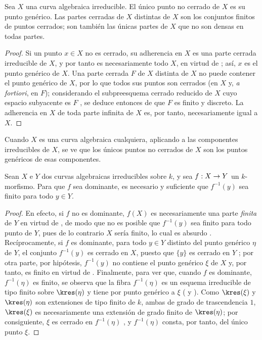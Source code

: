 \documentclass[oneside,10pt]{amsart}
\makeatletter
\newcommand{\ega@arrow}[2]{\mathchoice{#1}{#2}{#2}{#2}}
\renewcommand{\to}{\ega@arrow{\longrightarrow}{\rightarrow}}
\newcommand{\oldpage}[2][]{\marginnote{\normalfont\footnotesize\textbf{#1}~|~#2}\ignorespaces}
\let\EGAOriginalLabel\label
\renewcommand{\label}[1]{\phantomsection\EGAOriginalLabel{#1}}
\makeatother
\begin{document}
\begin{corollary}[7.4.3]
\label{II.7.4.3}
Sea $X$ una curva algebraica irreducible.
El único punto no cerrado de $X$ es su punto genérico.
Las partes cerradas de $X$ distintas de $X$ son los conjuntos finitos de puntos cerrados;
son también las únicas partes de $X$ que no son densas en todas partes.
\end{corollary}

\begin{proof}
Si un punto $x\in X$ no es cerrado, su adherencia en $X$ es una parte cerrada irreducible de $X$, y por tanto es necesariamente todo $X$, en virtud de ; así, $x$ es el punto genérico de $X$.
Una parte cerrada $F$ de $X$ distinta de $X$ no puede contener
\oldpage[II]{149}
el punto genérico de $X$, por lo que todos sus puntos son cerrados (en $X$ y, \emph{a fortiori}, en $F$);
considerando el subpreesquema cerrado reducido de $X$ cuyo espacio subyacente es $F$ , se deduce entonces de  que $F$ es finito y discreto.
La adherencia en $X$ de toda parte infinita de $X$ es, por tanto, necesariamente igual a $X$.
\end{proof}

Cuando $X$ es una curva algebraica cualquiera, aplicando  a las componentes irreducibles de $X$, se ve que los únicos puntos no cerrados de $X$ son los puntos genéricos de esas componentes.

\begin{corollary}[7.4.4]
\label{II.7.4.4}
Sean $X$ e $Y$ dos curvas algebraicas irreducibles sobre $k$, y sea $f:X\to Y$ un $k$-morfismo.
Para que $f$ sea dominante, es necesario y suficiente que $f^{-1}(y)$ sea finito para todo $y\in Y$.
\end{corollary}

\begin{proof}
En efecto, si $f$ no es dominante, $f(X)$ es necesariamente una parte \emph{finita} de $Y$ en virtud de , de modo que no es posible que $f^{-1}(y)$ sea finito para todo punto de $Y$, pues de lo contrario $X$ sería finito, lo cual es absurdo .
Recíprocamente, si $f$ es dominante, para todo $y\in Y$ distinto del punto genérico $\eta$ de $Y$, el conjunto $f^{-1}(y)$ es cerrado en $X$, puesto que $\{y\}$ es cerrado en $Y$ ;
por otra parte, por hipótesis, $f^{-1}(y)$ no contiene el punto genérico $\xi$ de $X$ y, por tanto, es finito en virtud de .
Finalmente, para ver que, cuando $f$ es dominante, $f^{-1}(\eta)$ es finito, se observa que la fibra $f^{-1}(\eta)$ es un esquema irreducible de tipo finito sobre $\kres(\eta)$ y tiene por punto genérico a $\xi$ ( y ).
Como $\kres(\xi)$ y $\kres(\eta)$ son extensiones de tipo finito de $k$, ambas de grado de trascendencia $1$, $\kres(\xi)$ es necesariamente una extensión de grado finito de $\kres(\eta)$; por consiguiente, $\xi$ es cerrado en $f^{-1}(\eta)$ , y $f^{-1}(\eta)$ consta, por tanto, del único punto $\xi$.
\end{proof}
\end{document}
